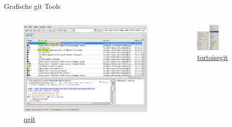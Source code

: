 \begin{frame}[allowframebreaks]{Grafische git Tools}
  \begin{columns}
    \begin{column}{0.56\textwidth}
      \begin{figure}
        \includegraphics[width=\textwidth]{img/qgit}
        \caption{\href{http://sourceforge.net/projects/qgit}{qgit}}
      \end{figure}
    \end{column}
    \begin{column}{0.56\textwidth}
      \begin{figure}
        \includegraphics[width=0.61\textwidth]{img/tortoisegit}
        \caption{\href{http://code.google.com/p/tortoisegit}{tortoisegit}}
      \end{figure}
    \end{column}
  \end{columns}
\end{frame}

